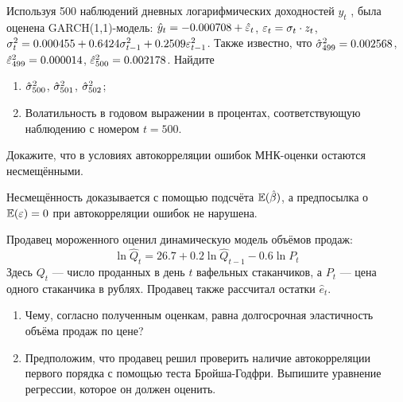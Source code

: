 \begin{problem}
Используя 500 наблюдений дневных логарифмических доходностей $y_t$ ,
была оценена GARCH(1,1)-модель: $\hat{y}_t=-0.000708+\hat{\varepsilon}_t$, $\varepsilon_t=\sigma_t \cdot z_t$, $\sigma^2_t=0.000455+0.6424\sigma^2_{t-1}+0.2509\varepsilon^2_{t-1}$. Также известно, что $\hat{\sigma}^2_{499}=0.002568$, $\hat{\varepsilon}^2_{499}=0.000014$, $\hat{\varepsilon}^2_{500}=0.002178$.
Найдите
\begin{enumerate}
\item  $\hat{\sigma}^2_{500}$, $\hat{\sigma}^2_{501}$, $\hat{\sigma}^2_{502}$;
\item Волатильность в годовом выражении в процентах, соответствующую
наблюдению с номером $t = 500$.
\end{enumerate}


\begin{sol}
\end{sol}
\end{problem}



\begin{problem}
Докажите, что в условиях автокорреляции ошибок МНК-оценки остаются несмещёнными.
\begin{sol}
Несмещённость доказывается с помощью подсчёта $\mathbb{E}(\hat{\beta})$, а предпосылка о $\mathbb{E}(\varepsilon)=0$ при автокорреляции ошибок не нарушена.
\end{sol}
\end{problem}



\begin{problem}
Продавец мороженного оценил динамическую модель объёмов продаж:
\[
\ln \hat{Q}_t=26.7 + 0.2\ln \hat{Q}_{t-1}-0.6\ln P_t
\]
Здесь $Q_t$ — число проданных в день $t$ вафельных стаканчиков, а $P_t$ — цена одного стаканчика в рублях. Продавец также рассчитал остатки $\hat{e}_t$.
\begin{enumerate}
\item Чему, согласно полученным оценкам, равна долгосрочная эластичность объёма продаж по цене?
\item Предположим, что продавец решил проверить наличие автокорреляции первого порядка с помощью теста Бройша-Годфри. Выпишите уравнение регрессии, которое он должен оценить.
\end{enumerate}


\begin{sol}
\end{sol}
\end{problem}


